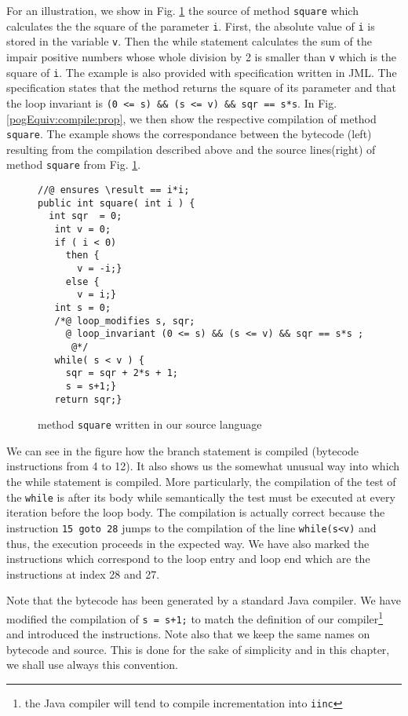 For an illustration, we show in Fig. \ref{pogComp:source:example} the source of method \lstinline!square! which calculates the 
the   square of the parameter \lstinline!i!.  First, the absolute value of \lstinline!i! is stored in the variable \lstinline!v!.
Then  the while statement  calculates the sum of the impair positive numbers whose whole division by 2 is smaller than
\lstinline!v! which is the square of \lstinline!i!.  The example is also
provided with specification written in JML. The specification states
that the method returns the square of its parameter and that the loop
invariant is \lstinline!(0 <= s) && (s <= v) && sqr == s*s!. In Fig. \ref{pogEquiv:compile:prop}, we 
then show the respective compilation of method \lstinline!square!.
The example shows the correspondance between  the bytecode (left) resulting from the compilation described above and the source lines(right)
 of method  \lstinline!square! from Fig. \ref{pogComp:source:example}.



\begin{figure}[ht!]
 \begin{lstlisting}[frame=trbl] 
//@ ensures \result == i*i; 
public int square( int i ) {
  int sqr  = 0;
   int v = 0;
   if ( i < 0)
     then {
       v = -i;} 
     else {
       v = i;}
   int s = 0;
   /*@ loop_modifies s, sqr;
     @ loop_invariant (0 <= s) && (s <= v) && sqr == s*s ;
      @*/
   while( s < v ) {
     sqr = sqr + 2*s + 1;
     s = s+1;}
   return sqr;}
 \end{lstlisting}
 \caption{\sc method  \lstinline!square! written in our source language}
 \label{pogComp:source:example}
 \end{figure}


We can see in the figure how the branch statement is compiled (bytecode instructions from 4 to 12).
 It also shows us the somewhat unusual way into which 
the while statement is compiled. More particularly, the compilation of the test of the \lstinline!while! is after its body while semantically the test must be executed 
at every iteration before the loop body.  The compilation is actually correct because the instruction 
\lstinline!15 goto 28! jumps to the compilation of the line \lstinline!while(s<v)! and thus, the execution proceeds in the expected way.
 We have also marked the instructions which correspond to the loop entry and loop end  which are the instructions at index 28 and 27. 
 

Note that the bytecode has been generated by a standard Java compiler. We have modified the compilation of  \lstinline!s = s+1;! to match the definition 
of our compiler\footnote{the Java compiler will tend to compile incrementation into \lstinline!iinc!} and introduced the \nop{} instructions.
 Note also that we keep the same names on bytecode and source. This is done for the sake of simplicity and in this chapter, we shall use always this convention.

